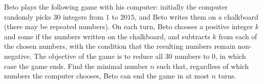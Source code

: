 Beto plays the following game with his computer: initially the computer randomly picks $30$ integers from $1$ to $2015$,  and Beto writes them on a chalkboard (there may be repeated numbers). On each turn, Beto chooses a positive integer $k$ and some if the numbers written on the chalkboard, and subtracts $k$ from each of the chosen numbers, with the condition that the resulting numbers remain non-negative. The objective of the game is to reduce all $30$ numbers to $0$,  in which case the game ends. Find the minimal number $n$ such that, regardless of which numbers the computer chooses, Beto can end the game in at most $n$ turns.